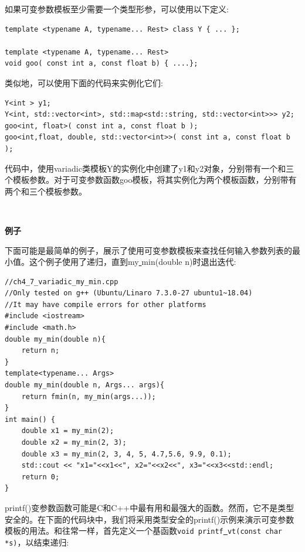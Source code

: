 如果可变参数模板至少需要一个类型形参，可以使用以下定义: \par

\begin{lstlisting}[caption={}]
template <typename A, typename... Rest> class Y { ... };

template <typename A, typename... Rest>
void goo( const int a, const float b) { ....};
\end{lstlisting}

类似地，可以使用下面的代码来实例化它们: \par

\begin{lstlisting}[caption={}]
Y<int > y1;
Y<int, std::vector<int>, std::map<std::string, std::vector<int>>> y2;
goo<int, float>( const int a, const float b );
goo<int,float, double, std::vector<int>>( const int a, const float b );
\end{lstlisting}

代码中，使用variadic类模板Y的实例化中创建了y1和y2对象，分别带有一个和三个模板参数。对于可变参数函数goo模板，将其实例化为两个模板函数，分别带有两个和三个模板参数。 \par

\noindent\textbf{}\ \par
\textbf{例子} \ \par
下面可能是最简单的例子，展示了使用可变参数模板来查找任何输入参数列表的最小值。这个例子使用了递归，直到my\underline{ }min(double n)时退出迭代: \par

\begin{lstlisting}[caption={}]
//ch4_7_variadic_my_min.cpp
//Only tested on g++ (Ubuntu/Linaro 7.3.0-27 ubuntu1~18.04)
//It may have compile errors for other platforms
#include <iostream>
#include <math.h>
double my_min(double n){
	return n;
}
template<typename... Args>
double my_min(double n, Args... args){
	return fmin(n, my_min(args...));
}
int main() {
	double x1 = my_min(2);
	double x2 = my_min(2, 3);
	double x3 = my_min(2, 3, 4, 5, 4.7,5.6, 9.9, 0.1);
	std::cout << "x1="<<x1<<", x2="<<x2<<", x3="<<x3<<std::endl;
	return 0;
}
\end{lstlisting}

printf()变参数函数可能是C和C++中最有用和最强大的函数。然而，它不是类型安全的。在下面的代码块中，我们将采用类型安全的printf()示例来演示可变参数模板的用法。和往常一样，首先定义一个基函数\texttt{void printf\underline{ }vt(const char *s)}，以结束递归: \par

